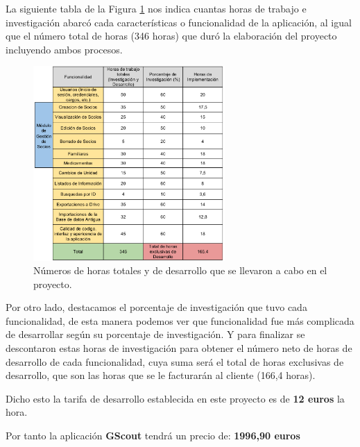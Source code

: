 


La siguiente tabla de la Figura \ref{fig:presupuesto} nos indica cuantas horas de trabajo e investigación abarcó cada características o funcionalidad de la aplicación, al igual que 
el número total de horas (346 horas) que duró la elaboración del proyecto incluyendo ambos procesos. \\

\begin{figure}[H]
\begin{center}
\includegraphics[width=0.65\textwidth]{images/presupuesto.jpg}
\caption{Números de horas totales y de desarrollo que se llevaron a cabo en el proyecto.}
\label{fig:presupuesto}
\end{center}
\end{figure}

\newpage

Por otro lado, destacamos el porcentaje de investigación que tuvo cada funcionalidad, de esta manera podemos ver que funcionalidad fue más complicada de
desarrollar según su porcentaje de investigación. Y para finalizar se descontaron estas horas de investigación para obtener el número neto de horas de desarrollo de cada funcionalidad, cuya suma será el 
total de horas exclusivas de desarrollo, que son las horas que se le facturarán al cliente (166,4 horas).\\

\bigskip

Dicho esto la tarifa de desarrollo establecida en este proyecto es de \textbf{12 euros} la hora.\\

\bigskip

Por tanto la aplicación \textbf{GScout} tendrá un precio de: {\Huge \textbf{1996,90 euros}}\\


